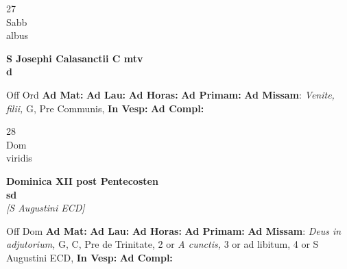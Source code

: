 \documentclass[10pt, openany]{book}
\begin{document}
    \begin{center}
        \begin{minipage}{3.5in}
            \vspace{2em}
            \begin{minipage}{0.5in}
                {\Huge 27} \\
                {\normalsize Sabb} \\
                {\normalsize albus}
            \end{minipage}
            \begin{minipage}{3.0in}
                \textbf{ \large S Josephi Calasanctii C mtv \\
                \textnormal{\normalsize d}} \\ 
            \end{minipage}
            \begin{justify}Off Ord
                \textbf{Ad Mat: }
                \textbf{Ad Lau: }
                \textbf{Ad Horas: }
                \textbf{Ad Primam: }\textbf{Ad Missam}: \textit{Venite, filii,} G, Pre Communis,  
                \textbf{In Vesp: }
                \textbf{Ad Compl: }
            \end{justify}
        \end{minipage}
    \end{center}

    \begin{center}
        \begin{minipage}{3.5in}
            \vspace{2em}
            \begin{minipage}{0.5in}
                {\Huge 28} \\
                {\normalsize Dom} \\
                {\normalsize viridis}
            \end{minipage}
            \begin{minipage}{3.0in}
                \textbf{ \large Dominica XII post Pentecosten \\
                \textnormal{\normalsize sd}} \\ \textit{[S Augustini ECD]} \\ 
            \end{minipage}
            \begin{justify}Off Dom
                \textbf{Ad Mat: }
                \textbf{Ad Lau: }
                \textbf{Ad Horas: }
                \textbf{Ad Primam: }\textbf{Ad Missam}: \textit{Deus in adjutorium,} G, C, Pre de Trinitate, 2 or \textit{A cunctis,} 3 or ad libitum, 4 or S Augustini ECD,  
                \textbf{In Vesp: }
                \textbf{Ad Compl: }
            \end{justify}
        \end{minipage}
    \end{center}
\end{document}
